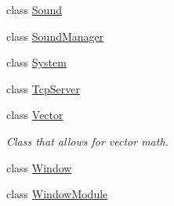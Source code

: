\begin{DoxyCompactItemize}
class \hyperlink{classmc_1_1_sound}{Sound}
\item 
class \hyperlink{classmc_1_1_sound_manager}{Sound\+Manager}
\item 
class \hyperlink{classmc_1_1_system}{System}
\item 
class \hyperlink{classmc_1_1_tcp_server}{Tcp\+Server}
\item 
class \hyperlink{classmc_1_1_vector}{Vector}
\begin{DoxyCompactList}\small\item\em Class that allows for vector math. \end{DoxyCompactList}\item 
class \hyperlink{classmc_1_1_window}{Window}
\item 
class \hyperlink{classmc_1_1_window_module}{Window\+Module}
\end{DoxyCompactItemize}
